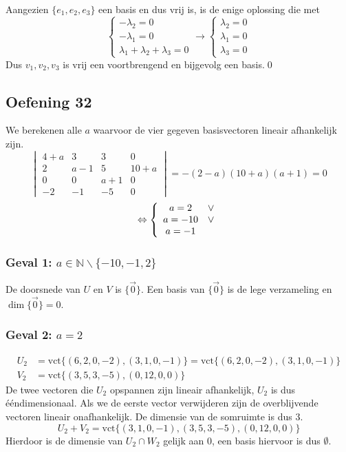 \documentclass[lineaire_algebra_oplossingen.tex]{subfiles}
\begin{document}
Aangezien $\{e_1,e_2,e_3\}$ een basis en dus vrij is, is de enige oplossing die met 
\begin{equation*}
\begin{cases}
-\lambda_2 = 0\\
-\lambda_1 = 0 \\
\lambda_1 + \lambda_2 + \lambda_3 = 0
\end{cases}
\rightarrow
\begin{cases}
\lambda_2 = 0\\
\lambda_1 = 0\\
\lambda_3 = 0
\end{cases}
\end{equation*}
Dus ${v_1,v_2,v_3}$ is vrij een voortbrengend en bijgevolg een basis.\qed

\subsection{Oefening 32}
We berekenen alle $a$ waarvoor de vier gegeven basisvectoren lineair afhankelijk zijn.
\[
\begin{vmatrix}
4+a & 3 & 3 & 0\\
2 & a-1 & 5 & 10+a\\
0 & 0 & a+1 & 0\\
-2 & -1 & -5 & 0
\end{vmatrix}
= -(2-a)(10+a)(a+1)=0
\]
\[
\Leftrightarrow 
\left\lbrace
\begin{array}{c c}
a = 2 &\vee\\
a = -10 &\vee\\
a = -1\\
\end{array}
\right.
\]
\subsubsection*{Geval 1: $a \in \mathbb{N}\backslash\{-10,-1,2\}$}
De doorsnede van $U$ en $V$ is $\{\vec{0}\}$. Een basis van $\{\vec{0}\}$ is de lege verzameling en $\dim\{\vec{0}\}=0$.

\subsubsection*{Geval 2: $a = 2$}
\begin{align*}
U_2 &= \text{vct}\{(6,2,0,-2),(3,1,0,-1)\} = \text{vct}\{(6,2,0,-2),(3,1,0,-1)\}\\
V_2 &= \text{vct}\{(3,5,3,-5),(0,12,0,0)\}
\end{align*}
De twee vectoren die $U_2$ opspannen zijn lineair afhankelijk, $U_2$ is dus \'e\'endimensionaal. Als we de eerste vector verwijderen zijn de overblijvende vectoren lineair onafhankelijk. De dimensie van de somruimte is dus $3$.
\[
U_2+V_2 = \text{vct}\{(3,1,0,-1),(3,5,3,-5),(0,12,0,0)\}
\]
Hierdoor is de dimensie van $U_2 \cap W_2$ gelijk aan 0, een basis hiervoor is dus $\emptyset$.
\end{document}

